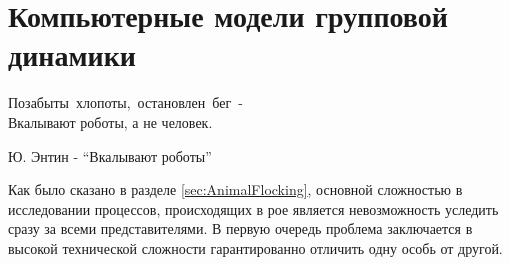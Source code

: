 \section{Компьютерные модели групповой динамики} %
\label{sec:ComputerModelsOfHords}

\epigraph{Позабыты~хлопоты,~остановлен~бег~- \\
Вкалывают роботы, а не человек.}{Ю. Энтин - ``Вкалывают роботы''}
Как было сказано в разделе \ref{sec:AnimalFlocking}, основной сложностью в исследовании процессов, происходящих в рое является невозможность уследить сразу за всеми представителями. В первую очередь проблема заключается в высокой технической сложности гарантированно отличить одну особь от другой.

